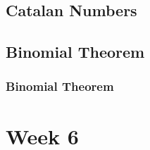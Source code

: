 \documentclass[12pt]{article}
\theoremstyle{definition}
\begin{document}
    
    \subsection{Catalan Numbers}
    
    \subsection{Binomial Theorem}
    \subsubsection{Binomial Theorem}

    \newpage
    \section{Week 6}
\end{document}
